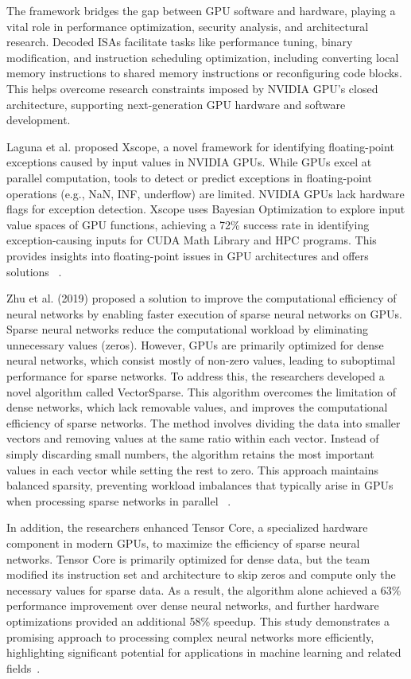 The framework bridges the gap between GPU software and hardware, playing a vital role in performance optimization, security analysis, and architectural research. Decoded ISAs facilitate tasks like performance tuning, binary modification, and instruction scheduling optimization, including converting local memory instructions to shared memory instructions or reconfiguring code blocks. This helps overcome research constraints imposed by NVIDIA GPU's closed architecture, supporting next-generation GPU hardware and software development.

Laguna et al. proposed Xscope, a novel framework for identifying floating-point exceptions caused by input values in NVIDIA GPUs. While GPUs excel at parallel computation, tools to detect or predict exceptions in floating-point operations (e.g., NaN, INF, underflow) are limited. NVIDIA GPUs lack hardware flags for exception detection. Xscope uses Bayesian Optimization to explore input value spaces of GPU functions, achieving a 72\% success rate in identifying exception-causing inputs for CUDA Math Library and HPC programs. This provides insights into floating-point issues in GPU architectures and offers solutions ~\cite{Laguna2022}.

Zhu et al. (2019) proposed a solution to improve the computational efficiency of neural networks by enabling faster execution of sparse neural networks on GPUs. Sparse neural networks reduce the computational workload by eliminating unnecessary values (zeros). However, GPUs are primarily optimized for dense neural networks, which consist mostly of non-zero values, leading to suboptimal performance for sparse networks. To address this, the researchers developed a novel algorithm called VectorSparse. This algorithm overcomes the limitation of dense networks, which lack removable values, and improves the computational efficiency of sparse networks. The method involves dividing the data into smaller vectors and removing values at the same ratio within each vector. Instead of simply discarding small numbers, the algorithm retains the most important values in each vector while setting the rest to zero. This approach maintains balanced sparsity, preventing workload imbalances that typically arise in GPUs when processing sparse networks in parallel ~\cite{Zhu2019}.

In addition, the researchers enhanced Tensor Core, a specialized hardware component in modern GPUs, to maximize the efficiency of sparse neural networks. Tensor Core is primarily optimized for dense data, but the team modified its instruction set and architecture to skip zeros and compute only the necessary values for sparse data. As a result, the algorithm alone achieved a 63\% performance improvement over dense neural networks, and further hardware optimizations provided an additional 58\% speedup. This study demonstrates a promising approach to processing complex neural networks more efficiently, highlighting significant potential for applications in machine learning and related fields~\cite{Zhu2019}.

